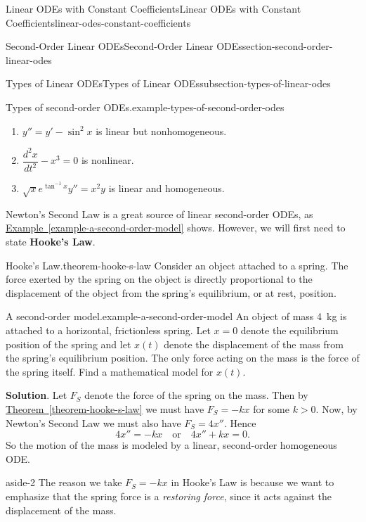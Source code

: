 \documentclass[oneside,10pt,]{book}
\newcommand{\terminology}[1]{\textbf{#1}}
\numberwithin{equation}{section}
\newcommand{\dv}[3][]{\dfrac{d^{#1} #2}{d #3^{#1}}}
\begin{document}
\begin{chapterptx}{Linear ODEs with Constant Coefficients}{}{Linear ODEs with Constant Coefficients}{}{}{linear-odes-constant-coefficients}
\begin{sectionptx}{Second-Order Linear ODEs}{}{Second-Order Linear ODEs}{}{}{section-second-order-linear-odes}
\begin{subsectionptx}{Types of Linear ODEs}{}{Types of Linear ODEs}{}{}{subsection-types-of-linear-odes}
\begin{example}{Types of second-order ODEs.}{example-types-of-second-order-odes}
\begin{enumerate}
\item\hypertarget{li-14}{}\(y'' = y' - \sin^{2}x\) is linear but nonhomogeneous.%
\item\hypertarget{li-15}{}\(\dv[2]{x}{t} - x^{3} = 0\) is nonlinear.%
\item\hypertarget{li-16}{}\(\sqrt{x}e^{\tan^{-1}x}y'' = x^{2}y\) is linear and homogeneous.%
\end{enumerate}
%
\end{example}
\hypertarget{p-148}{}%
Newton's Second Law is a great source of linear second-order ODEs, as \hyperref[example-a-second-order-model]{Example~\ref{example-a-second-order-model}} shows. However, we will first need to state \terminology{Hooke's Law}.%
\begin{theorem}{Hooke's Law.}{}{theorem-hooke-s-law}%
\hypertarget{p-149}{}%
Consider an object attached to a spring. The force exerted by the spring on the object is directly proportional to the displacement of the object from the spring's equilibrium, or at rest, position.%
\end{theorem}
\begin{example}{A second-order model.}{example-a-second-order-model}%
\hypertarget{p-150}{}%
An object of mass \SI{4}{\kilo\gram} is attached to a horizontal, frictionless spring. Let \(x=0\) denote the equilibrium position of the spring and let \(x(t)\) denote the displacement of the mass from the spring's equilibrium position. The only force acting on the mass is the force of the spring itself. Find a mathematical model for \(x(t)\).%
\par\smallskip%
\noindent\textbf{Solution}.\hypertarget{solution-24}{}\quad%
\hypertarget{p-151}{}%
Let \(F_{S}\) denote the force of the spring on the mass. Then by \hyperref[theorem-hooke-s-law]{Theorem~\ref{theorem-hooke-s-law}} we must have \(F_{S} = -kx\) for some \(k>0\). Now, by Newton's Second Law we must also have \(F_{S} = 4x''\). Hence%
\begin{equation*}
4x'' = -kx\quad\text{or}\quad4x''+kx = 0.
\end{equation*}
So the motion of the mass is modeled by a linear, second-order homogeneous ODE.%
\end{example}
\begin{aside}{}{aside-2}%
\hypertarget{p-152}{}%
The reason we take \(F_{S} = -kx\) in Hooke's Law is because we want to emphasize that the spring force is a \emph{restoring force}, since it acts against the displacement of the mass.%
\end{aside}

\end{subsectionptx}
\end{sectionptx}
\end{chapterptx}
\end{document}
